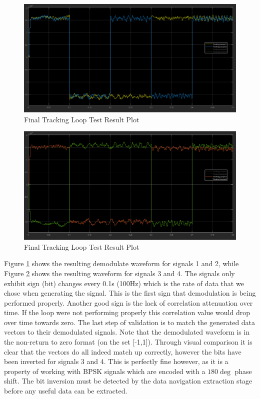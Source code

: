 \documentclass[11pt]{article}
\numberwithin{equation}{subsection}
\begin{document}
	
	\begin{figure}
		\centering
		\includegraphics[width=\textwidth]{Tracking_Test_Full_1}
		\caption{Final Tracking Loop Test Result Plot}
		
		\label{dmod1}
	\end{figure}	
	
	\begin{figure}
		\centering
		\includegraphics[width=\textwidth]{Tracking_Test_Full_2}
		\caption{Final Tracking Loop Test Result Plot}
		
		\label{dmod2}
	\end{figure}	
	
	Figure \ref{dmod1} shows the resulting demodulate waveform for signals 1 and 2, while Figure \ref{dmod2} shows the resulting waveform for signals 3 and 4. The signals only exhibit sign (bit) changes every 0.1s (100Hz) which is the rate of data that we chose when generating the signal. This is the first sign that demodulation is being performed properly. Another good sign is the lack of correlation attenuation over time. If the loop were not performing properly this correlation value would drop over time towards zero. The last step of validation is to match the generated data vectors to their demodulated signals. Note that the demodulated waveform is in the non-return to zero format (on the set [-1,1]). Through visual comparison it is clear that the vectors do all indeed match up correctly, however the bits have been inverted for signals 3 and 4. This is perfectly fine however, as it is a property of working with BPSK signals which are encoded with a $180\deg$ phase shift. The bit inversion must be detected by the data navigation extraction stage before any useful data can be extracted. 
\end{document}
